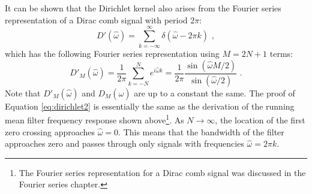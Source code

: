 It can be shown that the Dirichlet kernel also arises from the Fourier
series representation of a Dirac comb signal with period $2\pi$:
\begin{equation}
D'(\hat{\omega}) = \sum_{k=-\infty}^{\infty} \delta(\hat{\omega}-2\pi k) \,\,,
\label{eq:dirac_comb_dirichlet}
\end{equation}
which has the following Fourier series representation using $M=2N+1$ terms:
\begin{equation}
D'_M(\hat{\omega}) = \frac{1}{2\pi}\sum_{k=-N}^{N} e^{i \hat{\omega} k} = \frac{1}{2\pi}\frac{ \sin(\hat{\omega}M/2) }{\sin(\hat{\omega}/2)} \,\,.
\label{eq:dirichlet2}
\end{equation}
Note that $D'_M(\hat{\omega})$ and $D_M(\hat{\omega})$ are up to a
constant the same. The proof of Equation \ref{eq:dirichlet2} is
essentially the same as the derivation of the running mean filter
frequency response shown above\footnote{The Fourier series
representation for a Dirac comb signal was discussed in the Fourier
series chapter.}. As $N\rightarrow \infty$, the location of the first
zero crossing approaches $\hat{\omega}=0$. This means that the
bandwidth of the filter approaches zero and passes through only
signals with frequencies $\hat{\omega}=2\pi k$.

